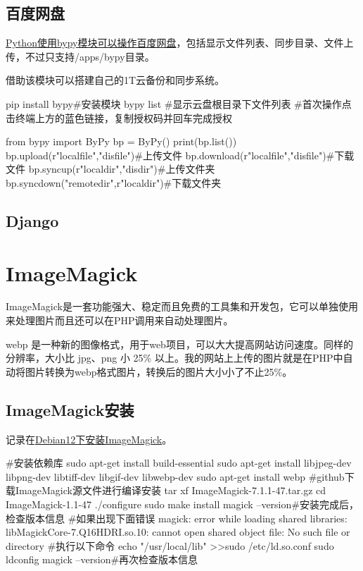 \subsection{百度网盘}
\href{https://blog.csdn.net/u010751000/article/details/130191192?ops_request_misc=%257B%2522request%255Fid%2522%253A%25221986353ffb0d0d65f2126a7f2b677eda%2522%252C%2522scm%2522%253A%252220140713.130102334..%2522%257D&request_id=1986353ffb0d0d65f2126a7f2b677eda&biz_id=0&utm_medium=distribute.pc_search_result.none-task-blog-2~all~sobaiduend~default-2-130191192-null-null.142^v101^pc_search_result_base7&utm_term=python%E7%99%BE%E5%BA%A6%E7%BD%91%E7%9B%98&spm=1018.2226.3001.4187}{Python使用bypy模块可以操作百度网盘}，包括显示文件列表、同步目录、文件上传，不过只支持/apps/bypy目录。

借助该模块可以搭建自己的1T云备份和同步系统。
\begin{shell}
pip install bypy#安装模块
bypy list #显示云盘根目录下文件列表
#首次操作点击终端上方的蓝色链接，复制授权码并回车完成授权
\end{shell}
\begin{shell}
from bypy import ByPy
bp = ByPy()
print(bp.list())
bp.upload(r"localfile","disfile")#上传文件
bp.download(r"localfile","disfile")#下载文件
bp.syncup(r"localdir","disdir")#上传文件夹
bp.syncdown("remotedir",r"localdir")#下载文件夹
\end{shell}
\subsection{Django}
\section{ImageMagick}
ImageMagick是一套功能强大、稳定而且免费的工具集和开发包，它可以单独使用来处理图片而且还可以在PHP调用来自动处理图片。

webp 是一种新的图像格式，用于web项目，可以大大提高网站访问速度。同样的分辨率，大小比 jpg、png 小 25\% 以上。我的网站上上传的图片就是在PHP中自动将图片转换为webp格式图片，转换后的图片大小小了不止25\%。
\subsection{ImageMagick安装}
记录在\href{https://blog.csdn.net/Wufjsjjx/article/details/135401894?spm=1001.2014.3001.5506}{Debian12下安装ImageMagick}。
\begin{shell}
#安装依赖库
sudo apt-get install build-essential 
sudo apt-get install libjpeg-dev libpng-dev libtiff-dev libgif-dev libwebp-dev 
sudo apt-get install webp
#github下载ImageMagick源文件进行编译安装
tar xf ImageMagick-7.1.1-47.tar.gz
cd ImageMagick-1.1-47
./configure
sudo make install
magick --version#安装完成后，检查版本信息
#如果出现下面错误
magick: error while loading shared libraries: libMagickCore-7.Q16HDRI.so.10: cannot open shared object file: No such file or directory 
#执行以下命令
echo "/usr/local/lib" >>sudo  /etc/ld.so.conf
sudo ldconfig
magick --version#再次检查版本信息
\end{shell}
